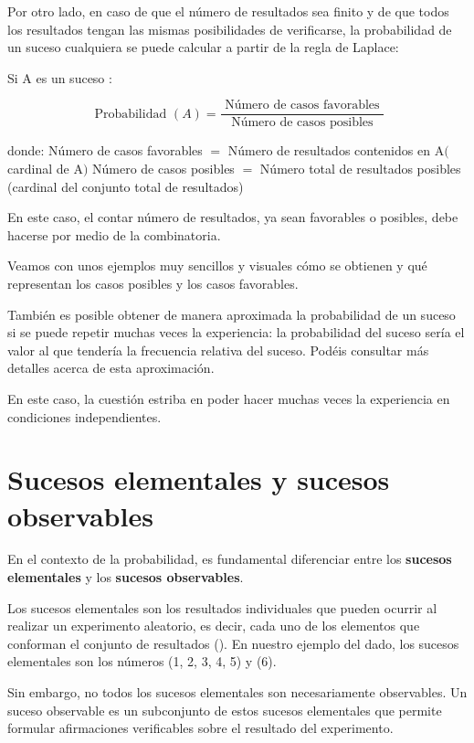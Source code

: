 \documentclass[
  a4paper,
  DIV=11,
  numbers=noendperiod]{scrreprt}
\begin{document}
Por otro lado, en caso de que el número de resultados sea finito y de
que todos los resultados tengan las mismas posibilidades de verificarse,
la probabilidad de un suceso cualquiera se puede calcular a partir de la
regla de Laplace:

Si A es un suceso :

\[
\text { Probabilidad }(A)=\frac{\text { Número de casos favorables }}{\text { Número de casos posibles }}
\]

donde: Número de casos favorables \(=\) Número de resultados contenidos
en \(\mathrm{A}(\) cardinal de A\()\) Número de casos posibles \(=\)
Número total de resultados posibles (cardinal del conjunto total de
resultados)

En este caso, el contar número de resultados, ya sean favorables o
posibles, debe hacerse por medio de la combinatoria.

Veamos con unos ejemplos muy sencillos y visuales cómo se obtienen y qué
representan los casos posibles y los casos favorables.

También es posible obtener de manera aproximada la probabilidad de un
suceso si se puede repetir muchas veces la experiencia: la probabilidad
del suceso sería el valor al que tendería la frecuencia relativa del
suceso. Podéis consultar más detalles acerca de esta aproximación.

En este caso, la cuestión estriba en poder hacer muchas veces la
experiencia en condiciones independientes.

\section{Sucesos elementales y sucesos
observables}\label{sucesos-elementales-y-sucesos-observables}

En el contexto de la probabilidad, es fundamental diferenciar entre los
\textbf{sucesos elementales} y los \textbf{sucesos observables}.

Los sucesos elementales son los resultados individuales que pueden
ocurrir al realizar un experimento aleatorio, es decir, cada uno de los
elementos que conforman el conjunto de resultados (\Omega). En nuestro
ejemplo del dado, los sucesos elementales son los números (1, 2, 3, 4,
5) y (6).

Sin embargo, no todos los sucesos elementales son necesariamente
observables. Un suceso observable es un subconjunto de estos sucesos
elementales que permite formular afirmaciones verificables sobre el
resultado del experimento.
\end{document}
